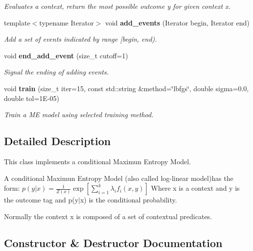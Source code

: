 \begin{CompactItemize}
\begin{CompactList}\small\item\em Evaluates a context, return the most possible outcome y for given context x. \item\end{CompactList}\item 
template$<$typename Iterator$>$ void {\bf add\_\-events} (Iterator begin, Iterator end)
\begin{CompactList}\small\item\em Add a set of events indicated by range [begin, end). \item\end{CompactList}\item 
void {\bf end\_\-add\_\-event} (size\_\-t cutoff=1)
\begin{CompactList}\small\item\em Signal the ending of adding events. \item\end{CompactList}\item 
void {\bf train} (size\_\-t iter=15, const std::string \&method=\char`\"{}lbfgs\char`\"{}, double sigma=0.0, double tol=1E-05)
\begin{CompactList}\small\item\em Train a ME model using selected training method. \item\end{CompactList}\end{CompactItemize}


\subsection{Detailed Description}
This class implements a conditional Maximun Entropy Model. 

A conditional Maximun Entropy Model (also called log-linear model)has the form: $p(y|x)=\frac{1}{Z(x)} \exp \left[\sum_{i=1}^k\lambda_if_i(x,y) \right]$ Where x is a context and y is the outcome tag and p(y$|$x) is the conditional probability.

Normally the context x is composed of a set of contextual predicates. 



\subsection{Constructor \& Destructor Documentation}
